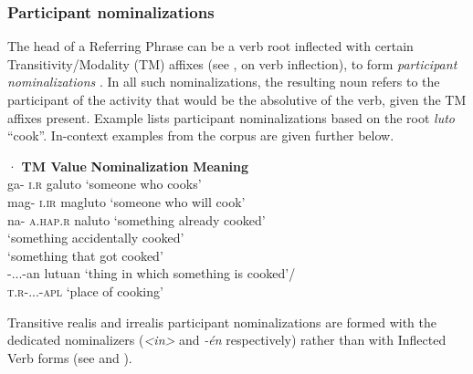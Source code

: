 \largerpage
\subsubsection{Participant nominalizations}
\label{sec:participantnominalizations}

The head of a Referring Phrase can be a verb root inflected with certain Transitivity/Modality (TM) affixes (see ,  on verb inflection), to form \textit{participant nominalizations} \citep[225]{payne1997}. In all such nominalizations, the resulting noun refers to the participant of the activity that would be the absolutive of the verb, given the TM affixes present. Example  lists participant nominalizations based on the root \textit{luto} “cook”. In-context examples from the corpus are given further below.


\ea
\label{bkm:Ref117494864}
\begin{tabbing}·
\textbf{TM Value} \hspace{1cm}\= \textbf{Nominalization} \= \textbf{Meaning} \\
 ga- \textsc{i.r} \> galuto   \> ‘someone who cooks’ \\
mag- \textsc{i.ir} \> magluto \> ‘someone who will cook’ \\
na- \textsc{a.hap.r} \> naluto \>   ‘something already cooked’ \\
\> \>‘something accidentally cooked’ \\
\> \> ‘something that got cooked’ \\
\emptyset{}-...-an\> lutuan    \> ‘thing in which something is cooked’/ \\
\textsc{t.r-...-apl}   \> \>‘place of cooking’
\end{tabbing}
\z

Transitive realis and irrealis participant nominalizations are formed with the dedicated nominalizers (\textit{{}<in>} and \textit{{}-én} respectively) rather than with Inflected Verb forms (see  and ). 

